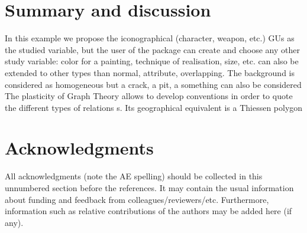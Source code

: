 \documentclass[article]{jss}\usepackage{knitr}
\begin{document}

\section{Summary and discussion} \label{sec:summary}

In this example we propose the iconographical  (character, weapon, etc.) GUs as the studied variable, but the user of the package can create and choose any other study variable: color for a painting, technique of realisation, size, etc.
 can also be extended to other types than normal, attribute, overlapping.
The background is considered as homogeneous but a crack, a pit, a something can also be considered
The plasticity of Graph Theory allows to develop conventions in order to quote the different types of relations s.
Its geographical equivalent is a Thiessen polygon




\section*{Acknowledgments}

\begin{leftbar}
All acknowledgments (note the AE spelling) should be collected in this
unnumbered section before the references. It may contain the usual information
about funding and feedback from colleagues/reviewers/etc. Furthermore,
information such as relative contributions of the authors may be added here
(if any).
\end{leftbar}







\newpage
\end{document}
